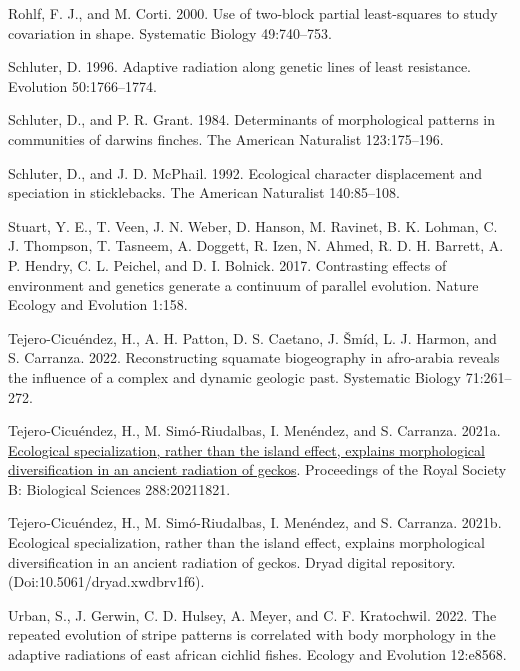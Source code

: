 \documentclass[
  11pt,
]{article}
\newlength{\cslhangindent}
\newlength{\cslentryspacingunit} %
\newenvironment{CSLReferences}[2] %
 {%
  \setlength{\parindent}{0pt}
  \ifodd #1
  \let\oldpar\par
  \def\par{\hangindent=\cslhangindent\oldpar}
  \fi
  \setlength{\parskip}{#2\cslentryspacingunit}
 }%
 {}
\begin{document}
\begin{CSLReferences}{1}{0}
\leavevmode{}%
Rohlf, F. J., and M. Corti. 2000. Use of two-block partial least-squares
to study covariation in shape. Systematic Biology 49:740--753.

\leavevmode{}%
Schluter, D. 1996. Adaptive radiation along genetic lines of least
resistance. Evolution 50:1766--1774.

\leavevmode{}%
Schluter, D., and P. R. Grant. 1984. Determinants of morphological
patterns in communities of darwin{\textquotesingle}s finches. The
American Naturalist 123:175--196.

\leavevmode{}%
Schluter, D., and J. D. McPhail. 1992. Ecological character displacement
and speciation in sticklebacks. The American Naturalist 140:85--108.

\leavevmode{}%
Stuart, Y. E., T. Veen, J. N. Weber, D. Hanson, M. Ravinet, B. K.
Lohman, C. J. Thompson, T. Tasneem, A. Doggett, R. Izen, N. Ahmed, R. D.
H. Barrett, A. P. Hendry, C. L. Peichel, and D. I. Bolnick. 2017.
Contrasting effects of environment and genetics generate a continuum of
parallel evolution. Nature Ecology and Evolution 1:158.

\leavevmode{}%
Tejero-Cicuéndez, H., A. H. Patton, D. S. Caetano, J. Šmíd, L. J.
Harmon, and S. Carranza. 2022. Reconstructing squamate biogeography in
afro-arabia reveals the influence of a complex and dynamic geologic
past. Systematic Biology 71:261--272.

\leavevmode{}%
Tejero-Cicuéndez, H., M. Simó-Riudalbas, I. Menéndez, and S. Carranza.
2021a. \href{https://doi.org/10.1098/rspb.2021.1821}{Ecological
specialization, rather than the island effect, explains morphological
diversification in an ancient radiation of geckos}. Proceedings of the
Royal Society B: Biological Sciences 288:20211821.

\leavevmode{}%
Tejero-Cicuéndez, H., M. Simó-Riudalbas, I. Menéndez, and S. Carranza.
2021b. Ecological specialization, rather than the island effect,
explains morphological diversification in an ancient radiation of
geckos. Dryad digital repository. (Doi:10.5061/dryad.xwdbrv1f6).

\leavevmode{}%
Urban, S., J. Gerwin, C. D. Hulsey, A. Meyer, and C. F. Kratochwil.
2022. The repeated evolution of stripe patterns is correlated with body
morphology in the adaptive radiations of east african cichlid fishes.
Ecology and Evolution 12:e8568.


\end{CSLReferences}
\end{document}
